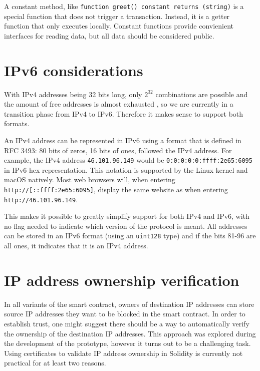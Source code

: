 A constant method, like \texttt{function greet() constant returns (string)} is a special function that does not trigger a transaction. Instead, it is a getter function that only executes locally. Constant functions provide convienient interfaces for reading data, but all data should be considered public.

\section{IPv6 considerations}

With IPv4 addresses being 32 bits long, only $ 2^{32} $ combinations are possible and the amount of free addresses is almost exhausted \cite{IPv4Exhaustion}, so we are currently in a transition phase from IPv4 to IPv6. Therefore it makes sense to support both formats.

An IPv4 address can be represented in IPv6 using a format that is defined in RFC 3493: 80 bits of zeros, 16 bits of ones, followed the IPv4 address. For example, the IPv4 address \texttt{46.101.96.149} would be \texttt{0:0:0:0:0:ffff:2e65:6095} in IPv6 hex representation. This notation is supported by the Linux kernel and macOS natively. Most web browsers will, when entering \texttt{http://[::ffff:2e65:6095]}, display the same website as when entering \texttt{http://46.101.96.149}.

This makes it possible to greatly simplify support for both IPv4 and IPv6, with no flag needed to indicate which version of the protocol is meant. All addresses can be stored in an IPv6 format (using an \texttt{uint128} type) and if the bits 81-96 are all ones, it indicates that it is an IPv4 address.







\section{IP address ownership verification}

In all variants of the smart contract, owners of destination IP addresses can store source IP addresses they want to be blocked in the smart contract. In order to establish trust, one might suggest there should be a way to automatically verify the ownership of the destination IP addresses. This approach was explored during the development of the prototype, however it turns out to be a challenging task. Using certificates to validate IP address ownership in Solidity is currently not practical for at least two reasons.

